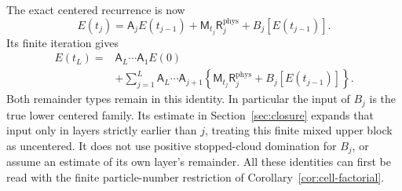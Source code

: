 The exact centered recurrence is now
\begin{equation}\label{cent:layer-identity}
 E(t_j)=\mathsf A_jE(t_{j-1})
       +\mathsf M_{t_j}\mathsf R_j^{\mathrm{phys}}
       +B_j[E(t_{j-1})].
\end{equation}
Its finite iteration gives
\begin{align}\label{cent:finite-layers}
 E(t_L)={}&\mathsf A_L\cdots\mathsf A_1E(0)\nonumber\\
 &+\sum_{j=1}^L\mathsf A_L\cdots\mathsf A_{j+1}
 \left\{\mathsf M_{t_j}\mathsf R_j^{\mathrm{phys}}
                     +B_j[E(t_{j-1})]\right\}.
\end{align}
Both remainder types remain in this identity. In particular the
input of $B_j$ is the true lower centered family. Its estimate in
Section~\ref{sec:closure} expands that input only in layers strictly
earlier than $j$, treating this finite mixed upper block as
uncentered. It does not use positive stopped-cloud domination for
$B_j$, or assume an estimate of its own layer's remainder.
All these identities can first be read with the finite
particle-number restriction of Corollary~\ref{cor:cell-factorial}.

